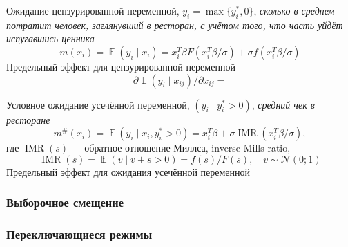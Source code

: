 \documentclass[12pt]{article}
\DeclareMathOperator{\IMR}{IMR} %
\DeclareMathOperator{\E}{\mathbb{E}}
\newcommand{\cN}{\mathcal{N}}
\begin{document}
Ожидание цензурированной переменной, $y_i = \max\{ y_i^*, 0 \}$, \emph{сколько в среднем потратит человек, заглянувший в ресторан, с учётом того, что часть уйдёт испугавшись ценника}
\[
m(x_i) = \E(y_i \mid  x_i) = x_i^T \beta F(x_i^T \beta /\sigma) + \sigma f(x_i^T \beta / \sigma)
\]
Предельный эффект для цензурированной переменной 
\[
\partial \E(y_i \mid  x_{ij})/ \partial x_{ij} = 
\]


Условное ожидание усечённой переменной, $(y_i \mid y_i^* > 0)$, \emph{средний чек в ресторане}
\[
m^\#(x_i) = \E(y_i \mid x_i, y_i^* > 0) = x_i^T \beta  + \sigma \IMR(x_i^T \beta / \sigma),
\]
где $\IMR(s)$ — обратное отношение Миллса, inverse Mills ratio,
\[
\IMR(s) = \E(v \mid v + s > 0) = f(s) / F(s), \quad v\sim \cN(0;1)
\]
Предельный эффект для ожидания усечённой переменной


\subsubsection*{Выборочное смещение}


\subsubsection*{Переключающиеся режимы}




\listoftheorems[ignoreall,show={theorem,definition}]


\printbibliography[heading=none]
\end{document}
